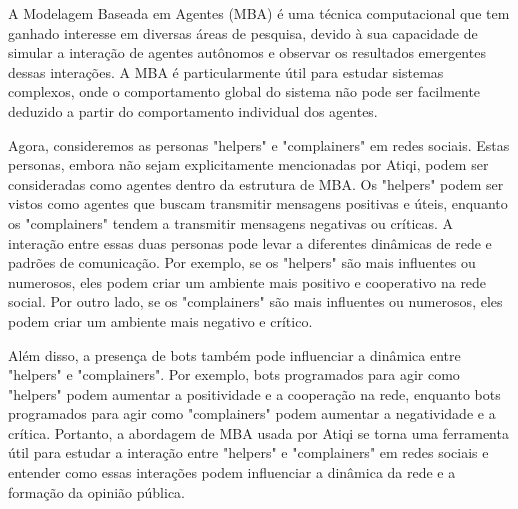 A Modelagem Baseada em Agentes (MBA) é uma técnica computacional que tem ganhado interesse em diversas áreas de pesquisa, devido à sua capacidade de simular a interação de agentes autônomos e observar os resultados emergentes dessas interações. A MBA é particularmente útil para estudar sistemas complexos, onde o comportamento global do sistema não pode ser facilmente deduzido a partir do comportamento individual dos agentes.

Agora, consideremos as personas "helpers" e "complainers" em redes sociais. Estas personas, embora não sejam explicitamente mencionadas por Atiqi, podem ser consideradas como agentes dentro da estrutura de MBA. Os "helpers" podem ser vistos como agentes que buscam transmitir mensagens positivas e úteis, enquanto os "complainers" tendem a transmitir mensagens negativas ou críticas. A interação entre essas duas personas pode levar a diferentes dinâmicas de rede e padrões de comunicação. Por exemplo, se os "helpers" são mais influentes ou numerosos, eles podem criar um ambiente mais positivo e cooperativo na rede social. Por outro lado, se os "complainers" são mais influentes ou numerosos, eles podem criar um ambiente mais negativo e crítico.

Além disso, a presença de bots também pode influenciar a dinâmica entre "helpers" e "complainers". Por exemplo, bots programados para agir como "helpers" podem aumentar a positividade e a cooperação na rede, enquanto bots programados para agir como "complainers" podem aumentar a negatividade e a crítica. Portanto, a abordagem de MBA usada por Atiqi se torna uma ferramenta útil para estudar a interação entre "helpers" e "complainers" em redes sociais e entender como essas interações podem influenciar a dinâmica da rede e a formação da opinião pública.